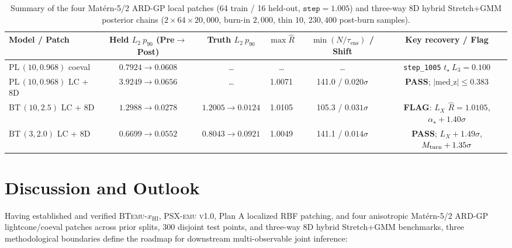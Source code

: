 \documentclass[aps,prd,reprint,superscriptaddress,nofootinbib,amsmath,amssymb,floatfix,longbibliography]{revtex4-2}
\begin{document}
\begin{table}[!tb]
\caption{Summary of the four Mat\'ern-5/2 ARD-GP local patches (64 train / 16 held-out, $\texttt{step}=1.005$) and three-way 8D hybrid Stretch+GMM posterior chains ($2\times 64\times 20{,}000$, burn-in $2{,}000$, thin $10$, $230{,}400$ post-burn samples).}
\label{tab:ard_gmm}
\scriptsize
\setlength{\tabcolsep}{1.8pt}
\begin{ruledtabular}
\begin{tabular}{lccccc}
Model / Patch & Held $L_2\ p_{90}$ (Pre$\to$Post) & Truth $L_2\ p_{90}$ & $\max \widehat{R}$ & $\min(N/\tau_{\mathrm{ens}})$ / Shift & Key recovery / Flag \\
\hline
$\mathrm{PL}\,(10, 0.968)$ coeval & $0.7924 \to 0.0608$ & \dots & \dots & \dots & \texttt{step\_1005} $t_\star\ L_3=0.100$ \\
$\mathrm{PL}\,(10, 0.968)$ LC + 8D & $3.9249 \to 0.0656$ & \dots & 1.0071 & 141.0 / $0.020\sigma$ & \textbf{PASS}; $|\mathrm{med\_z}|\le 0.383$ \\
$\mathrm{BT}\,(10, 2.5)$ LC + 8D & $1.2988 \to 0.0278$ & $1.2005 \to 0.0124$ & 1.0105 & 105.3 / $0.031\sigma$ & \textbf{FLAG}: $L_X$ $\widehat{R}=1.0105$, $\alpha_\star +1.40\sigma$ \\
$\mathrm{BT}\,(3, 2.0)$ LC + 8D & $0.6699 \to 0.0552$ & $0.8043 \to 0.0921$ & 1.0049 & 141.1 / $0.014\sigma$ & \textbf{PASS}; $L_X +1.49\sigma$, $M_{\rm turn} +1.35\sigma$ \\
\end{tabular}
\end{ruledtabular}
\end{table}

\section{Discussion and Outlook}\label{sec:discussion}

Having established and verified \textsc{BTemu}-$x_{\mathrm{HI}}$, \textsc{PSX-emu v1.0}, Plan A localized RBF patching, and four anisotropic Mat\'ern-5/2 ARD-GP lightcone/coeval patches across prior splits, 300 disjoint test points, and three-way 8D hybrid Stretch+GMM benchmarks, three methodological boundaries define the roadmap for downstream multi-observable joint inference:
\end{document}
